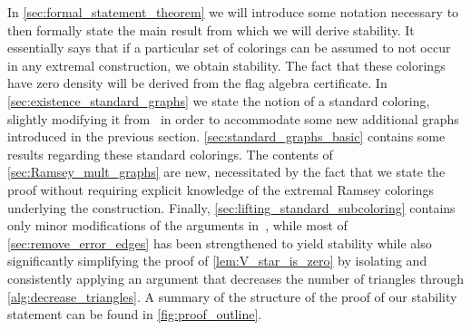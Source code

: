 \documentclass[a4paper,11pt]{article}
\numberwithin{equation}{section}
\begin{document}
In \cref{sec:formal_statement_theorem} we will introduce some notation necessary to then formally state the main result from which we will derive stability. It essentially says that if a particular set of colorings can be assumed to not occur in any extremal construction, we obtain stability. The fact that these colorings have zero density will be derived from the flag algebra certificate. In \cref{sec:existence_standard_graphs} we state the notion of a standard coloring, slightly modifying it from~\cite{CummingsEtAl_2013} in order to accommodate some new additional graphs introduced in the previous section. 
 \cref{sec:standard_graphs_basic} contains some results regarding these standard colorings.
 The contents of \cref{sec:Ramsey_mult_graphs} are new, necessitated by the fact that we state the proof without requiring explicit knowledge of the extremal Ramsey colorings underlying the construction. Finally, \cref{sec:lifting_standard_subcoloring} 
 contains only minor modifications of the arguments in~\cite{CummingsEtAl_2013},  while
 most of \cref{sec:remove_error_edges} has been strengthened to yield stability 
while also significantly simplifying the proof of \cref{lem:V_star_is_zero} by isolating and consistently applying an argument that decreases the number of triangles through \cref{alg:decrease_triangles}. A summary of the structure of the proof of our stability statement can be found in \cref{fig:proof_outline}.
\end{document}
